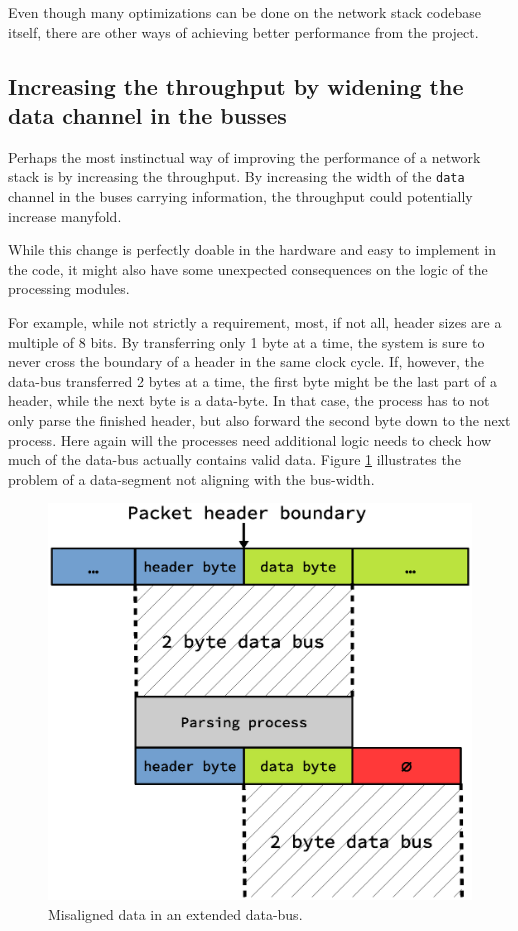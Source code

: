 Even though many optimizations can be done on the network stack codebase
itself, there are other ways of achieving better performance from the project.

\subsection{Increasing the throughput by widening the data channel in the
busses}
Perhaps the most instinctual way of improving the performance of a network
stack is by increasing the throughput. By increasing the width of the
\texttt{data} channel in the buses carrying information, the throughput could
potentially increase manyfold.

While this change is perfectly doable in the hardware and easy to implement in
the code, it might also have some unexpected consequences on the logic of the
processing modules.

For example, while not strictly a requirement, most, if not all, header sizes
are a multiple of 8 bits. By transferring only 1 byte at a time, the system is
sure to never cross the boundary of a header in the same clock cycle. If,
however, the data-bus transferred 2 bytes at a time, the first byte might be
the last part of a header, while the next byte is a data-byte. In that case,
the process has to not only parse the finished header, but also forward the
second byte down to the next process. Here again will the processes need
additional logic needs to check how much of the data-bus actually contains
valid data. Figure \ref{fig:bus_width_boundaries} illustrates the problem of a
data-segment not aligning with the bus-width.

\begin{figure}
\centering
\includegraphics[scale=0.45]{discussion/bus_width_boundaries.eps}
\caption{Misaligned data in an extended data-bus. }
\label{fig:bus_width_boundaries}
\end{figure}





